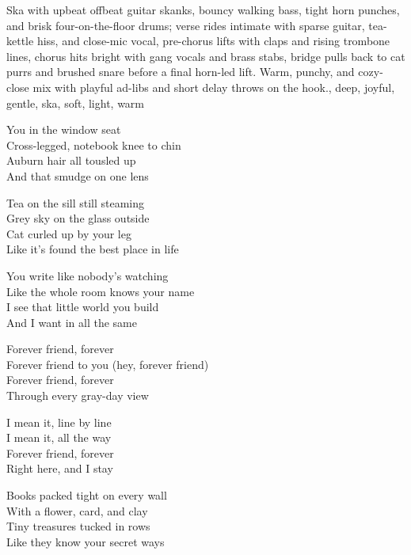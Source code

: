 
\begin{notes}
\end{notes}
\begin{style}
Ska with upbeat offbeat guitar skanks, bouncy walking bass, tight horn punches, and brisk four-on-the-floor drums; verse rides intimate with sparse guitar, tea-kettle hiss, and close-mic vocal, pre-chorus lifts with claps and rising trombone lines, chorus hits bright with gang vocals and brass stabs, bridge pulls back to cat purrs and brushed snare before a final horn-led lift. Warm, punchy, and cozy-close mix with playful ad-libs and short delay throws on the hook., deep, joyful, gentle, ska, soft, light, warm
\end{style}
\begin{lyrics}
You in the window seat\\
Cross-legged, notebook knee to chin\\
Auburn hair all tousled up\\
And that smudge on one lens

Tea on the sill still steaming\\
Grey sky on the glass outside\\
Cat curled up by your leg\\
Like it's found the best place in life

You write like nobody's watching\\
Like the whole room knows your name\\
I see that little world you build\\
And I want in all the same

Forever friend, forever\\
Forever friend to you
(hey, forever friend)\\
Forever friend, forever\\
Through every gray-day view

I mean it, line by line\\
I mean it, all the way\\
Forever friend, forever\\
Right here, and I stay

Books packed tight on every wall\\
With a flower, card, and clay\\
Tiny treasures tucked in rows\\
Like they know your secret ways


\end{lyrics}
